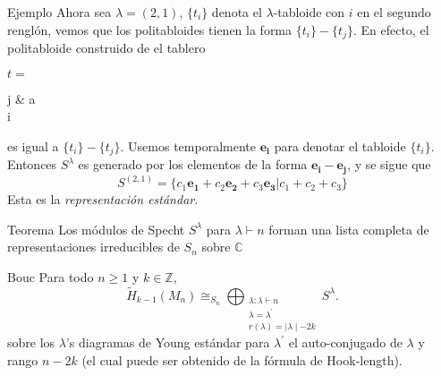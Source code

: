 \documentclass[final,xcolor=svgnames]{beamer}
\begin{document}
\begin{frame}{}
\begin{columns}
\begin{column}{0.5\textwidth}
\begin{block}{Ejemplo}
         Ahora sea $\lambda=(2,1)$, $\{t_{i}\}$ denota el $\lambda$-tabloide
         con $i$ en el segundo renglón, vemos que los politabloides tienen la
         forma  $\{t_{i}\}- \{t_{j}\}$. En efecto, el politabloide construido
         de el tablero
         \begin{center}$t=$
           \begin{ytableau}
             j & a \\
             i\\
           \end{ytableau}
         \end{center}
         es igual a $\{t_{i}\}- \{t_{j}\}$. Usemos temporalmente
         $\boldsymbol{e_{i}}$ para denotar el tabloide $\{t_{i}\}$. Entonces
         $S^{\lambda}$ es generado por los elementos de la forma
         $\boldsymbol{e_{i}}-\boldsymbol{e_{j}}$, y se sigue que
         $$S^{(2,1)}=\{c_{1}\boldsymbol{e_{1}}+c_{2}\boldsymbol{e_{2}}+c_{3}\boldsymbol{e_{3}}|c_{1}+c_{2}+c_{3}\}$$ 
         Esta es la \textit{representación estándar}. 
     \end{block}

     \begin{block}{Teorema}
         Los módulos de Specht $S^{\lambda}$ para $\lambda\vdash n$ forman
         una lista completa de representaciones irreducibles de $S_{n}$ sobre $\mathbb{C}$
      \end{block}

      \begin{block}{Bouc}
          Para todo $n\geq1$ y $k\in \mathbb{Z}$,
          \begin{equation*}
            \widetilde H_{k-1}(M_{n})\cong_{S_{n}}\bigoplus_{\substack{\lambda:\lambda\vdash n\\
              \lambda=\lambda^{'}\\r(\lambda)=\mid \lambda \mid-2k}} S^{\lambda}.
          \end{equation*}
          sobre los $\lambda$'s diagramas de Young estándar para $\lambda^{'}$
          el auto-conjugado de $\lambda$ y rango $n-2k$ (el cual puede ser
          obtenido de la fórmula de Hook-length).
      \end{block}
    \end{column}
  \end{columns}


\end{frame}
\end{document}
